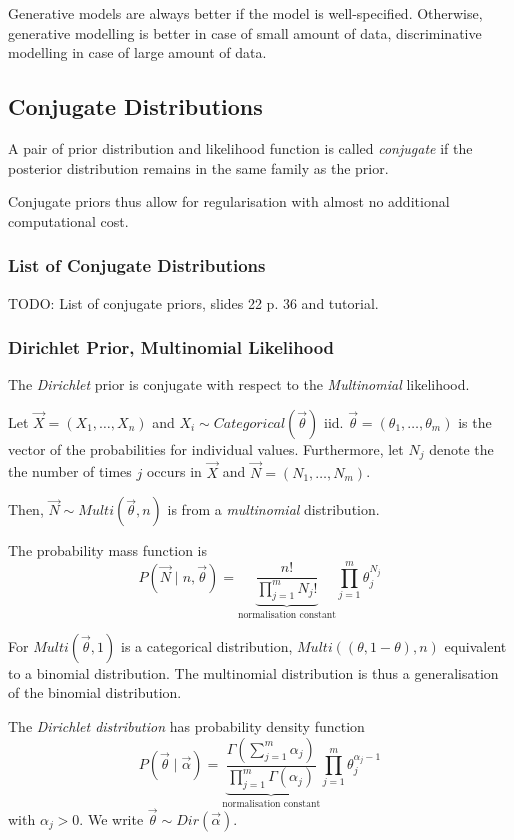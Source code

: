 Generative models are always better if
the model is well-specified.
Otherwise, generative modelling is
better in case of small amount of data,
discriminative modelling in
case of large amount of data.


\subsection{Conjugate Distributions}
A pair of prior distribution and likelihood function
is called \emph{conjugate} if
the posterior distribution remains in
the same family as the prior.

Conjugate priors thus allow for regularisation
with almost no additional computational cost.

\subsubsection{List of Conjugate Distributions}
TODO: List of conjugate priors, slides 22 p. 36 and tutorial.

\subsubsection{Dirichlet Prior, Multinomial Likelihood}
The \emph{Dirichlet} prior is conjugate with
respect to the \emph{Multinomial} likelihood.

Let $\vec{X} = (X_1, \dotsc, X_n)$ and
$X_i \sim Categorical(\vec{\theta})$ iid.
$\vec{\theta} = (\theta_1, \dotsc, \theta_m)$
is the vector of the probabilities for
individual values.
Furthermore, let $N_j$ denote the
the number of times $j$ occurs in $\vec{X}$
and $\vec{N} = (N_1, \dotsc, N_m)$.

Then, $\vec{N} \sim Multi(\vec{\theta}, n)$
is from a \emph{multinomial} distribution.

The probability mass function is
\begin{equation*}
    P(\vec{N} \mid n, \vec{\theta}) =
    \underbrace{\frac{n!}{\prod_{j=1}^m{N_j!}}}_\text{normalisation constant}
    \prod_{j=1}^m{\theta_j^{N_j}}
\end{equation*}

For $Multi(\vec{\theta}, 1)$ is a categorical
distribution,
$Multi((\theta, 1 - \theta), n)$ equivalent to a binomial distribution.
The multinomial distribution is thus a
generalisation of the binomial distribution.

The \emph{Dirichlet distribution} has probability density function
\begin{equation*}
    P(\vec{\theta} \mid \vec{\alpha}) =
    \underbrace{\frac{\Gamma(\sum_{j=1}^m{\alpha_j})}{\prod_{j=1}^m{\Gamma(\alpha_j)}}}_\text{normalisation constant}
    \prod_{j=1}^m{\theta_j^{\alpha_j - 1}}
\end{equation*}
with $\alpha_j > 0$.
We write $\vec{\theta} \sim Dir(\vec{\alpha})$.

